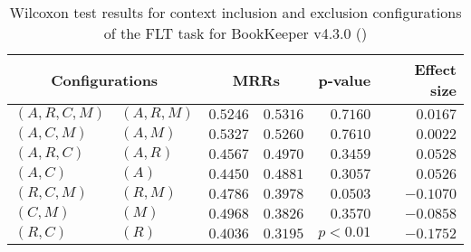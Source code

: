 
\begin{table}
\begin{spacing}{1.2}
\centering
\caption{Wilcoxon test results for context inclusion and exclusion configurations of the FLT task for BookKeeper v4.3.0 (\ctwo)}
\label{table:versus-wilcox-bookkeeper-flt-context}
\begin{tabular}{ll|rr|rr}
\toprule
      \multicolumn{2}{c|}{Configurations} &                \multicolumn{2}{c|}{MRRs} &             p-value & Effect size \\
\midrule
 $(A,R,C,M)$ &  $(A,R,M)$ &       $0.5246$ &  $\bm{0.5316}$ & $0.7160$ &    $0.0167$ \\
   $(A,C,M)$ &    $(A,M)$ &  $\bm{0.5327}$ &       $0.5260$ & $0.7610$ &    $0.0022$ \\
   $(A,R,C)$ &    $(A,R)$ &       $0.4567$ &  $\bm{0.4970}$ & $0.3459$ &    $0.0528$ \\
     $(A,C)$ &      $(A)$ &       $0.4450$ &  $\bm{0.4881}$ & $0.3057$ &    $0.0526$ \\
   $(R,C,M)$ &    $(R,M)$ &  $\bm{0.4786}$ &       $0.3978$ & $0.0503$ &   $-0.1070$ \\
     $(C,M)$ &      $(M)$ &  $\bm{0.4968}$ &       $0.3826$ & $0.3570$ &   $-0.0858$ \\
     $(R,C)$ &      $(R)$ &  $\bm{0.4036}$ &       $0.3195$ & $p<0.01$ &   $-0.1752$ \\
\bottomrule
\end{tabular}

\end{spacing}
\end{table}

